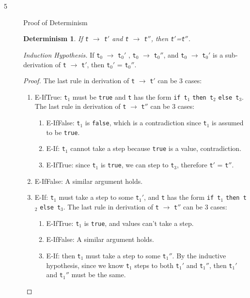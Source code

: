\documentclass{article}
\newtheorem{deter}{Determinism}
\begin{document}
\begin{description}
\newpage

  \item[5]{Proof of Determinism}
    \begin{deter}If \verb|t| $\longrightarrow$ \verb|t|$'$ and \verb|t| $\longrightarrow$ \verb|t|$''$, then \verb|t|$'$=\verb|t|$''$.
    \end{deter}

    \textit{Induction Hypothesis.} If \verb|t|$_0$ $\longrightarrow$ \verb|t|$_0'$ , \verb|t|$_0$ $\longrightarrow$ \verb|t|$_0''$, and \verb|t|$_0$ $\longrightarrow$ \verb|t|$_0'$ is a sub-derivation of \verb|t| $\longrightarrow$ \verb|t|$'$, then \verb|t|$_0'$ = \verb|t|$_0''$.

    \begin{proof}
      The last rule in derivation of \verb|t| $\longrightarrow$ \verb|t|$'$ can be 3 cases:
      \begin{enumerate}
        \item E-IfTrue: \verb|t|$_1$ must be \verb|true| and \verb|t| has the form
        \verb|if t|$_1$ \verb|then t|$_2$ \verb|else t|$_3$.
          The last rule in derivation of \verb|t| $\longrightarrow$ \verb|t|$''$ can be 3 cases:
          \begin{enumerate}
            \item E-IfFalse: \verb|t|$_1$ is \verb|false|, which is a contradiction since \verb|t|$_1$ is assumed to be \verb|true|.
            \item E-If: \verb|t|$_1$ cannot take a step because \verb|true| is a value, contradiction.
            \item E-IfTrue: since \verb|t|$_1$ is \verb|true|, we can step to \verb|t|$_3$, therefore \verb|t|$'$ = \verb|t|$''$.
          \end{enumerate}

        \item E-IfFalse: A similar argument holds.

        \item E-If: \verb|t|$_1$ must take a step to some \verb|t|$_1'$, and \verb|t| has the form
        \verb|if t|$_1$ \verb|then t|$_2$ \verb|else t|$_3$.
        The last rule in derivation of \verb|t| $\longrightarrow$ \verb|t|$''$ can be 3 cases:
          \begin{enumerate}
            \item E-IfTrue: \verb|t|$_1$ is \verb|true|, and values can't take a step.
            \item E-IfFalse: A similar argument holds.
            \item E-If: then \verb|t|$_1$ must take a step to some \verb|t|$_1''$. By the inductive hypothesis, since we know \verb|t|$_1$ steps to both \verb|t|$_1'$ and \verb|t|$_1''$,
            then \verb|t|$_1'$ and \verb|t|$_1''$ must be the same.
            \end{enumerate}
      \end{enumerate}
    \end{proof}


\end{description}
\end{document}
